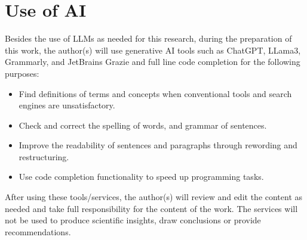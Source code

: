 \section{Use of AI}
\label{sec:use-of-ai}

Besides the use of LLMs as needed for this research, during the preparation of this work, the author(s) will use
generative AI tools such as ChatGPT, LLama3, Grammarly, and JetBrains Grazie and full line code completion for the
following purposes:

\begin{itemize}
    \item Find definitions of terms and concepts when conventional tools and search engines are unsatisfactory.
    \item Check and correct the spelling of words, and grammar of sentences.
    \item Improve the readability of sentences and paragraphs through rewording and restructuring.
    \item Use code completion functionality to speed up programming tasks.
\end{itemize}

After using these tools/services, the author(s) will review and edit the content as needed and take full
responsibility for the content of the work.
The services will not be used to produce scientific insights, draw conclusions or provide recommendations.